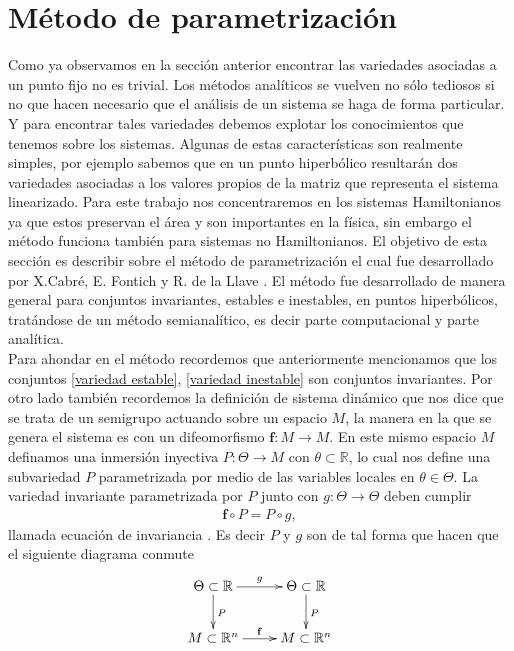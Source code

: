 \section{Método de parametrización}
Como ya observamos en la sección anterior encontrar las variedades asociadas a un punto fijo no es trivial. Los métodos analíticos se vuelven no sólo tediosos si no que hacen necesario que el análisis de un sistema se haga de forma particular. Y para encontrar tales variedades debemos explotar los conocimientos que tenemos sobre los sistemas. Algunas de estas características son realmente simples, por ejemplo sabemos que en un punto hiperbólico resultarán dos variedades asociadas a los valores propios de la matriz que representa el sistema linearizado. Para este trabajo nos concentraremos en los sistemas Hamiltonianos ya que estos preservan el área y son importantes en la física, sin embargo el método funciona también para sistemas no Hamiltonianos. El objetivo de esta sección es describir sobre el método de parametrización el cual fue desarrollado por X.Cabré, E. Fontich y R. de la Llave \cite{Haro}. El método fue desarrollado de manera general para conjuntos invariantes, estables e inestables, en puntos hiperbólicos, tratándose de un método semianalítico, es decir parte computacional y parte analítica.\\

Para ahondar en el método recordemos que anteriormente mencionamos que los conjuntos \eqref{variedad estable}, \eqref{variedad inestable} son conjuntos invariantes. Por otro lado también recordemos la definición de sistema dinámico que nos dice que se trata de un semigrupo actuando sobre un espacio $M$, la manera en la que se genera el sistema es con un difeomorfismo $\mathbf{f}:M \rightarrow M$. En este mismo espacio $M$ definamos una inmersión inyectiva $P:\Theta \rightarrow M$ con $\theta\subset \mathbb{R}$, lo cual nos define una subvariedad $P$ parametrizada por medio de las variables locales en $\theta \in \Theta$. La variedad invariante parametrizada por $P$  junto con $g:\Theta \rightarrow \Theta$ deben cumplir 
\begin{eqnarray}
\mathbf{f} \circ P = P \circ g,  \label{Ecua de invariancia}
\end{eqnarray}
llamada ecuación de invariancia \cite{Haro}.
Es decir $P$ y $g$ son de tal forma que hacen que el siguiente diagrama conmute
\begin{eqnarray}
\xymatrix{
\Theta\subset\mathbb{R} \ar[d]^{P} \ar[r]^{g} & \Theta\subset\mathbb{R} \ar[d]^{P} \\
M\subset\mathbb{R}^{n} \ar[r]^{\mathbf{f}} & M\subset\mathbb{R}^{n}
}\label{conmutativo}
\end{eqnarray}

